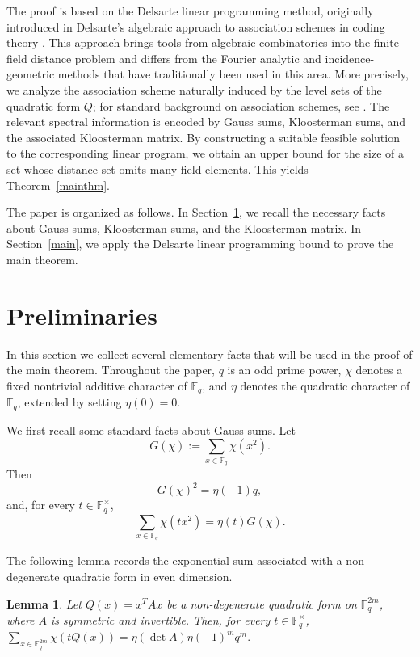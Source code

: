 \documentclass[11pt]{article}
\newtheorem{lemma}[theorem]{Lemma}
\newcommand{\1}{\mathbf{1}}
\begin{document}
The proof is based on the Delsarte linear programming method, originally
introduced in Delsarte's algebraic approach to association schemes in coding
theory \cite{D1973}. This approach brings tools from algebraic
combinatorics into the finite field distance problem and differs from the
Fourier analytic and incidence-geometric methods that have traditionally
been used in this area. More precisely, we analyze the association scheme
naturally induced by the level sets of the quadratic form \(Q\); for standard
background on association schemes, see \cite{BCN1989}.
The relevant spectral information is encoded by Gauss sums, Kloosterman sums, and the associated Kloosterman matrix. By constructing a suitable feasible solution to the corresponding linear program, we obtain an upper bound for the size of a set whose distance set omits many field elements. This yields Theorem~\ref{mainthm}.

The paper is organized as follows. In Section~\ref{pre}, we recall the necessary facts about Gauss sums, Kloosterman sums, and the Kloosterman matrix. In Section~\ref{main}, we apply the Delsarte linear programming bound to prove the main theorem.


\section{Preliminaries}\label{pre}

In this section we collect several elementary facts that will be used in the proof of the main theorem. Throughout the paper, \(q\) is an odd prime power, \(\chi\) denotes a fixed nontrivial additive character of \(\mathbb{F}_q\), and \(\eta\) denotes the quadratic character of \(\mathbb{F}_q\), extended by setting \(\eta(0)=0\).

We first recall some standard facts about Gauss sums. Let
\[
G(\chi):=\sum_{x\in\mathbb{F}_q}\chi(x^2).
\]
Then
\[
G(\chi)^2=\eta(-1)q,
\]
and, for every \(t\in\mathbb{F}_q^\times\),
\[
\sum_{x\in\mathbb{F}_q}\chi(tx^2)=\eta(t)G(\chi).
\]

The following lemma records the exponential sum associated with a non-degenerate quadratic form in even dimension.

\begin{lemma}\label{lem-gauss-qf}
	Let \(Q(x)=x^T A x\) be a non-degenerate quadratic form on \(\mathbb{F}_q^{2m}\), where \(A\) is symmetric and invertible. Then, for every \(t\in\mathbb{F}_q^\times\), $\sum_{x\in\mathbb{F}_q^{2m}}\chi(tQ(x))
	=
	\eta(\det A)\eta(-1)^m q^m.$
\end{lemma}
\end{document}
